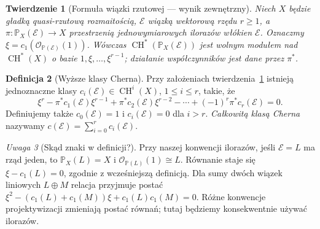 \documentclass[11pt,a4paper,openany]{report}
\numberwithin{equation}{section}
\theoremstyle{plain}
\newtheorem{twierdzenie}{Twierdzenie}[section]
\theoremstyle{definition}
\newtheorem{definicja}[twierdzenie]{Definicja}
\theoremstyle{remark}
\newtheorem{uwaga}[twierdzenie]{Uwaga}
\newcommand{\PP}{\mathbb P}
\begin{document}
\begin{twierdzenie}[Formuła wiązki rzutowej — wynik zewnętrzny]
\label{tw:ga7-projective-bundle}
Niech $X$ będzie gładką quasi-rzutową rozmaitością,
$\mathcal E$ wiązką wektorową rzędu $r\ge1$, a
$\pi:\PP_X(\mathcal E)\to X$ przestrzenią
jednowymiarowych ilorazów włókien $\mathcal E$.
Oznaczmy $\xi=c_1(\mathcal O_{\PP(\mathcal E)}(1))$.
Wówczas $\operatorname{CH}^*(\PP_X(\mathcal E))$ jest
wolnym modułem nad $\operatorname{CH}^*(X)$ o bazie
$1,\xi,\ldots,\xi^{r-1}$; działanie współczynników
jest dane przez $\pi^*$.
\end{twierdzenie}

\begin{definicja}[Wyższe klasy Cherna]
\label{def:ga7-c-classes}
Przy założeniach twierdzenia~\ref{tw:ga7-projective-bundle}
istnieją jednoznaczne klasy
$c_i(\mathcal E)\in\operatorname{CH}^i(X)$, $1\le i\le r$,
takie, że
\[
\xi^r-\pi^*c_1(\mathcal E)\xi^{r-1}
+\pi^*c_2(\mathcal E)\xi^{r-2}
-\cdots+(-1)^r\pi^*c_r(\mathcal E)=0.
\]
Definiujemy także $c_0(\mathcal E)=1$ i
$c_i(\mathcal E)=0$ dla $i>r$.
\emph{Całkowitą klasą Cherna} nazywamy
$c(\mathcal E)=\sum_{i=0}^r c_i(\mathcal E)$.
\end{definicja}

\begin{uwaga}[Skąd znaki w definicji?]
Przy naszej konwencji ilorazów, jeśli $\mathcal E=L$
ma rząd jeden, to $\PP_X(L)=X$ i
$\mathcal O_{\PP(L)}(1)\cong L$. Równanie staje się
$\xi-c_1(L)=0$, zgodnie z wcześniejszą definicją.
Dla sumy dwóch wiązek liniowych $L\oplus M$ relacja
przyjmuje postać
$\xi^2-(c_1(L)+c_1(M))\xi+c_1(L)c_1(M)=0$.
Różne konwencje projektywizacji zmieniają postać
równań; tutaj będziemy konsekwentnie używać ilorazów.
\end{uwaga}
\end{document}
